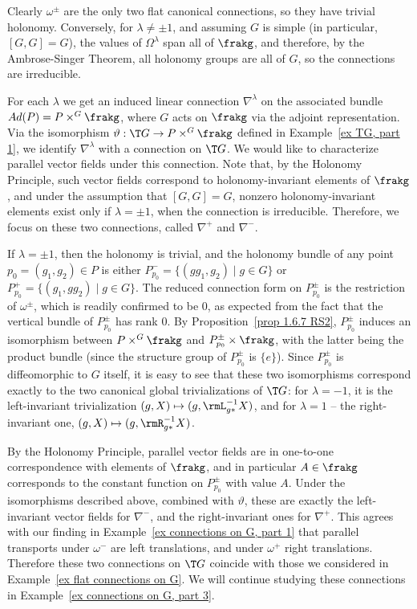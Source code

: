 \begin{example}\label{ex connections on G, part 2}
    Clearly $\omega^{\pm}$ are the only two flat canonical connections, so they have trivial holonomy. Conversely, for $\lambda\neq\pm 1$, and assuming $G$ is simple (in particular, $[G,G]=G$), the values of $\Omega^\lambda$ span all of $\frakg$, and therefore, by the Ambrose-Singer Theorem, all holonomy groups are all of $G$, so the connections are irreducible.

    For each $\lambda$ we get an induced linear connection $\nabla^\lambda$ on the associated bundle $Ad(P)=P\times^G \frakg$, where $G$ acts on $\frakg$ via the adjoint representation. Via the isomorphism $\vartheta:\T G\to P\times^G \frakg$ defined in Example~\ref{ex TG, part 1}, we identify $\nabla^\lambda$ with a connection on $\T G$. We would like to characterize parallel vector fields under this connection. Note that, by the Holonomy Principle, such vector fields correspond to holonomy-invariant elements of $\frakg$, and under the assumption that $[G,G]=G$, nonzero holonomy-invariant elements exist only if $\lambda=\pm 1$, when the connection is irreducible. Therefore, we focus on these two connections, called $\nabla^+$ and $\nabla^-$.
    
    If $\lambda=\pm 1$, then the holonomy is trivial, and the holonomy bundle of any point $p_0=(g_1,g_2)\in P$ is either $P^{-}_{p_0}=\{(gg_1,g_2)\mid g\in G\}$ or $P^{+}_{p_0}=\{(g_1,gg_2)\mid g\in G\}$. The reduced connection form on $P_{p_0}^{\pm}$ is the restriction of $\omega^{\pm}$, which is readily confirmed to be $0$, as expected from the fact that the vertical bundle of $P_{p_0}^{\pm}$ has rank $0$. By Proposition~\ref{prop 1.6.7 RS2}, $P_{p_0}^{\pm}$ induces an isomorphism between $P\times^G\frakg$ and $P_{p_0}^{\pm}\times\frakg$, with the latter being the product bundle (since the structure group of $P_{p_0}^{\pm}$ is $\{e\}$). Since $P_{p_0}^{\pm}$ is diffeomorphic to $G$ itself, it is easy to see that these two isomorphisms correspond exactly to the two canonical global trivializations of $\T G$: for $\lambda=-1$, it is the left-invariant trivialization $(g,X)\mapsto (g,\rmL_{g\ast}^{-1}X)$, and for $\lambda=1$ -- the right-invariant one, $(g,X)\mapsto (g,\rmR_{g\ast}^{-1}X)$. 

    By the Holonomy Principle, parallel vector fields are in one-to-one correspondence with elements of $\frakg$, and in particular $A\in \frakg$ corresponds to the constant function on $P_{p_0}^{\pm}$ with value $A$. Under the isomorphisms described above, combined with $\vartheta$, these are exactly the left-invariant vector fields for $\nabla^-$, and the right-invariant ones for $\nabla^+$. This agrees with our finding in Example~\ref{ex connections on G, part 1} that parallel transports under $\omega^-$ are left translations, and under $\omega^+$ right translations. Therefore these two connections on $\T G$ coincide with those we considered in Example~\ref{ex flat connections on G}. We will continue studying these connections in Example~\ref{ex connections on G, part 3}.
\end{example}

